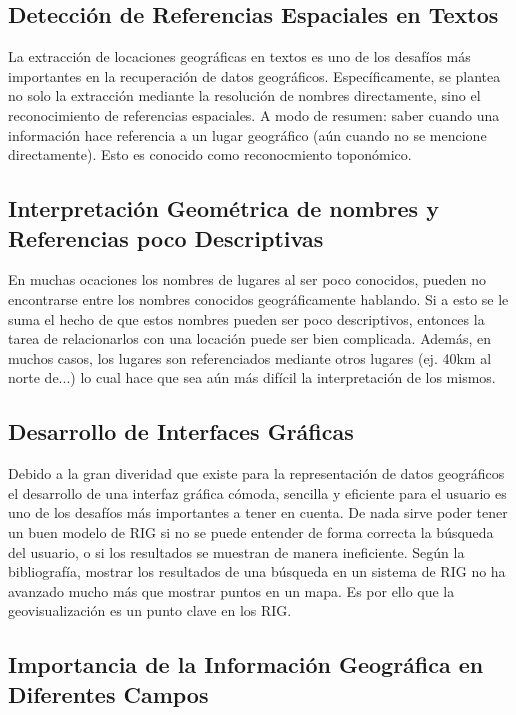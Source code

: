 \documentclass{llncs}
\begin{document}
\subsection{Detección de Referencias Espaciales en Textos}\label{sec:detect}

La extracción de locaciones geográficas en textos es uno de los desafíos más
importantes en la recuperación de datos geográficos. Específicamente, se plantea
no solo la extracción mediante la resolución de nombres directamente, sino
el reconocimiento de referencias espaciales. A modo de resumen: saber cuando una
información hace referencia a un lugar geográfico (aún cuando no se mencione
directamente). Esto es conocido como reconocmiento toponómico.

\subsection{Interpretación Geométrica de nombres y Referencias poco
Descriptivas}\label{sec:geom}

En muchas ocaciones los nombres de lugares al ser poco conocidos, pueden no
encontrarse entre los nombres conocidos geográficamente hablando. Si a esto
se le suma el hecho de que estos nombres pueden ser poco descriptivos, entonces
la tarea de relacionarlos con una locación puede ser bien complicada. Además,
en muchos casos, los lugares son referenciados mediante otros lugares (ej. 
40km al norte de...) lo cual hace que sea aún más difícil la interpretación de
los mismos.

\subsection{Desarrollo de Interfaces Gráficas}\label{sec:gui}

Debido a la gran diveridad que existe para la representación de datos
geográficos el desarrollo de una interfaz gráfica cómoda, sencilla y eficiente
para el usuario es uno de los desafíos más importantes a tener en cuenta. De
nada sirve poder tener un buen modelo de RIG si no se puede entender de forma
correcta la búsqueda del usuario, o si los resultados se muestran de manera
ineficiente. Según la bibliografía, mostrar los resultados de una búsqueda en
un sistema de RIG no ha avanzado mucho más que mostrar puntos en un mapa. Es
por ello que la geovisualización es un punto clave en los RIG.


\subsection{Importancia de la Información Geográfica en Diferentes
Campos}\label{sec:import}
\end{document}
